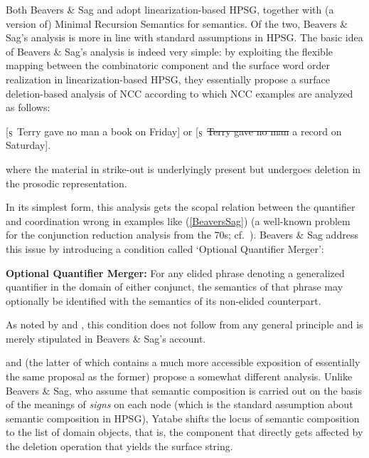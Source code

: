 \documentclass[output=paper]{langsci/langscibook}
\begin{document}
Both Beavers \& Sag and \citet{Yatabe2001a} adopt linearization-based HPSG, together
with (a version of) Minimal Recursion Semantics for
semantics. Of the two, Beavers \& Sag's
analysis is more in line with standard assumptions in HPSG. The basic
idea of Beavers \& Sag's analysis is indeed very simple: by exploiting the flexible
mapping between the combinatoric component and the surface word order
realization in linearization-based HPSG, they essentially propose a
surface deletion-based analysis of NCC according to which NCC examples
are analyzed as follows:

\begin{exe}
 \ex\label{BeaversSag}
  [$_{\scalebox{.7}{\textrm{S}}}$ Terry gave no man a book on Friday] or
  [$_{\scalebox{.7}{\textrm{S}}}$ \sout{Terry gave no man} a record on Saturday]. 
\end{exe}
where the material in strike-out is underlyingly present but undergoes
deletion in the prosodic representation.

In its simplest form, this analysis gets the scopal relation between
the quantifier and coordination wrong in examples like (\ref{BeaversSag}) (a
well-known problem for the conjunction reduction analysis from the 70s; cf.\ \citet{partee70}).
Beavers \& Sag address this issue by introducing a condition called `Optional
Quantifier Merger':

\begin{exe}
 \ex\label{OQM}
  \textbf{Optional Quantifier Merger:} For any elided phrase 
  denoting a generalized quantifier in the 
  domain of either conjunct, the semantics of that phrase may
  optionally be identified with the semantics of its non-elided
  counterpart.
\end{exe}
As noted by \citet{levine11} and \citet{kubota-levine-coord}, this condition
does not follow from any general principle and is merely stipulated in
Beavers \& Sag's account.

\citet{Yatabe2001a} and \citet{yatabe-tam2017} (the latter of which contains a
much more accessible exposition of essentially the same proposal as
the former) propose a somewhat different analysis. Unlike Beavers \& Sag, who
assume that semantic composition is carried out on the basis of the
meanings of \emph{signs} on each node (which is the standard assumption
about semantic composition in HPSG), Yatabe shifts the locus of
semantic composition to the list of domain objects, that is, the
component that directly gets affected by the deletion operation that
yields the surface string.
\end{document}

